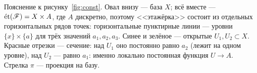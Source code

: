 Пояснение к рисунку~\ref{fig:const}. Овал внизу --- база $X$;
всё вместе --- $\et(\Shv{F})=X\times A$, где $A$ дискретно,
поэтому <<этажёрка>> состоит из отдельных горизонтальных
рядов точек:
горизонтальные пунктирные линии --- уровни $\{x\}\times\{a\}$
для трёх значений $a_1,a_2,a_3$. Синее и зелёное --- открытые
$U_1,U_2\subset X$. Красные отрезки --- сечение: над $U_1$ оно
постоянно равно $a_2$ (лежит на одном уровне), над $U_2$ ---
равно $a_1$: именно локально постоянная функция $U\to A$.
Стрелка $\pi$ --- проекция на базу.

\begin{bookbox}
\end{bookbox}

